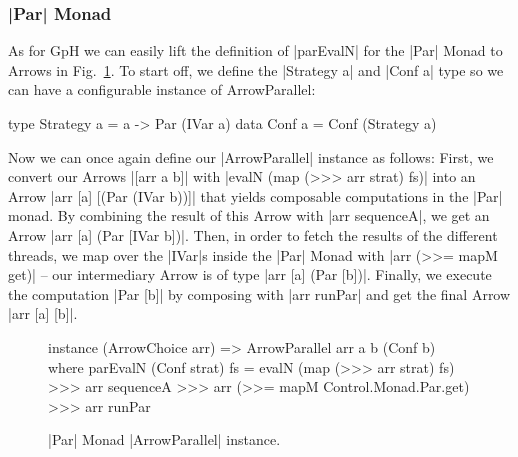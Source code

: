 \subsubsection{|Par| Monad}
As for GpH we can easily lift the definition of |parEvalN| for the |Par| Monad to Arrows in Fig.~\ref{fig:ArrowParallelParMonad}. To start off, we define the |Strategy a| and |Conf a| type so we can have a configurable instance of ArrowParallel:
\begin{code}
type Strategy a = a -> Par (IVar a)
data Conf a = Conf (Strategy a)
\end{code}
Now we can once again define our |ArrowParallel| instance as follows: First, we convert our Arrows |[arr a b]| with |evalN (map (>>> arr strat) fs)| into an Arrow |arr [a] [(Par (IVar b))]| that yields composable computations in the |Par| monad. By combining the result of this Arrow with |arr sequenceA|, we get an Arrow |arr [a] (Par [IVar b])|. Then, in order to fetch the results of the different threads, we map over the |IVar|s inside the |Par| Monad with |arr (>>= mapM get)| -- our intermediary Arrow is of type |arr [a] (Par [b])|. Finally, we execute the computation |Par [b]| by composing with |arr runPar| and get the final Arrow |arr [a] [b]|.
\begin{figure}[h]
\begin{code}
instance (ArrowChoice arr) => ArrowParallel arr a b (Conf b) where
    parEvalN (Conf strat) fs =
        evalN (map (>>> arr strat) fs) >>>
        arr sequenceA >>>
        arr (>>= mapM Control.Monad.Par.get) >>>
        arr runPar
\end{code} %
\caption{|Par| Monad |ArrowParallel| instance.}
\label{fig:ArrowParallelParMonad}
\end{figure}

